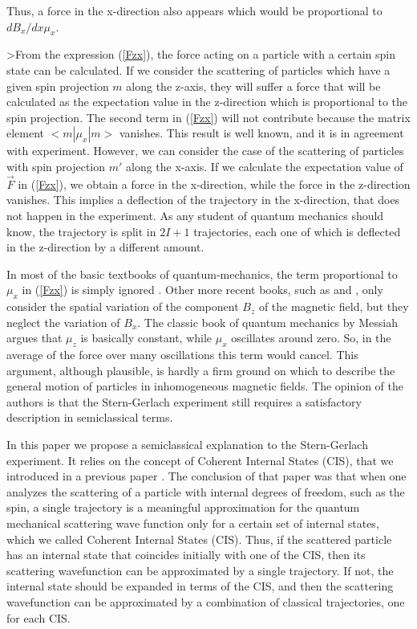 Thus, a force in the x-direction also appears which would be 
proportional to $dB_x/dx \mu_x$.


>From the expression (\ref{Fzx}), the force acting on a particle with a certain 
spin state can be calculated. If we consider the scattering of particles which
have a given spin projection $m$ along the z-axis, they will suffer a force
that will be calculated as the expectation value
in the z-direction which is proportional to the spin projection. The second
term  in (\ref{Fzx}) will not contribute because the matrix element
$<m|\mu_x|m>$ vanishes. This result is well known, and it is in agreement
with experiment. However, we can consider the case of the scattering of
particles with spin projection $m'$ along the x-axis. If we calculate the
expectation value of $\vec F$ in (\ref{Fzx}), we  obtain a force in the
x-direction, while the force in the z-direction vanishes. This  implies a
deflection of the trajectory in the x-direction, that does not  happen
in the experiment. As any student of quantum mechanics should know, the 
trajectory is split in $2I+1$ trajectories, each one of which is deflected
in the z-direction by a different amount.


In most of the basic textbooks of quantum-mechanics, the term proportional to
$\mu_x$ in (\ref{Fzx}) is simply ignored \cite{eis}.   Other more recent 
books, such as \cite{lev} and \cite{mer}, only consider the spatial variation
of the component $B_z$ of the magnetic field, but they neglect the variation
of $B_x$. The classic book of quantum mechanics
by Messiah \cite{mes} argues that  $\mu_z$ is basically
constant, while $\mu_x$ oscillates around zero. So, in the average of the force
over many oscillations this term would cancel. This argument, although 
plausible, is hardly a firm ground on which to describe the general motion of
particles in inhomogeneous magnetic fields.
The opinion of the authors is that the Stern-Gerlach experiment still requires
a satisfactory description in semiclassical terms. 

In this paper we propose a semiclassical explanation to the Stern-Gerlach 
experiment. It relies on the concept of Coherent Internal States (CIS), that we
introduced in a previous paper \cite{sara}. The conclusion of that paper 
was that when one analyzes the scattering of a particle with
internal degrees of freedom, such as the spin, a single  trajectory  is a
meaningful approximation for the quantum mechanical scattering wave function
only for a certain set of internal states, which we called Coherent Internal
States (CIS). Thus, if the scattered particle has an internal state that 
coincides initially with one of the CIS, then its scattering wavefunction
can be approximated by a single trajectory. If not, the internal state
should be expanded in terms of the CIS, and then the scattering wavefunction
can be approximated by a combination of classical trajectories, one for each 
CIS.

